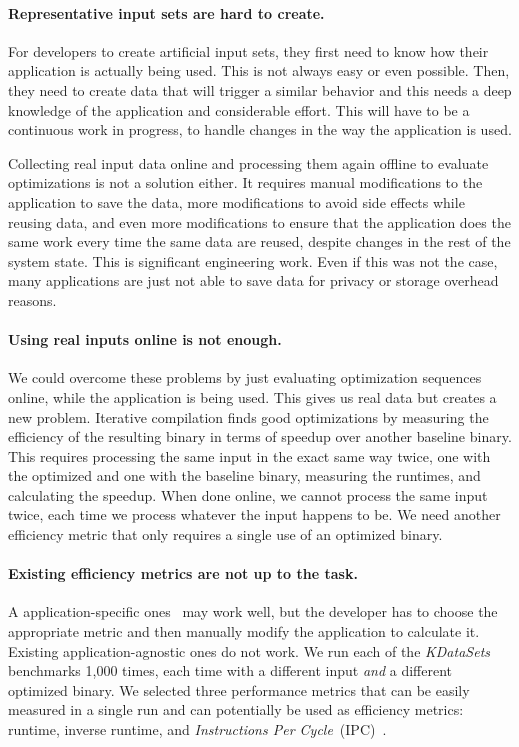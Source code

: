    \paragraph{Representative input sets are hard to create.} For developers to create artificial input sets, they first need to know how
    their application is actually being used. This is not always easy or even possible. Then, they need to create data that will trigger a
    similar behavior and this needs a deep knowledge of the application and considerable effort. This will have to be a continuous work in
    progress, to handle changes in the way the application is used.

    Collecting real input data online and processing them again offline to evaluate optimizations is not a solution either. It requires
    manual modifications to the application to save the data, more modifications to avoid side effects while reusing data, and even more
    modifications to ensure that the application does the same work every time the same data are reused, despite changes in the rest of
    the system state. This is significant engineering work. Even if this was not the case, many applications are just not able to save
    data for privacy or storage overhead reasons.
    
    \paragraph{Using real inputs online is not enough.} We could overcome these problems by just evaluating optimization sequences online,
    while the application is being used. This gives us real data but creates a new problem. Iterative compilation finds good optimizations
    by measuring the efficiency of the resulting binary in terms of speedup over another baseline binary. This requires processing the same
    input in the exact same way twice, one with the optimized and one with the baseline binary, measuring the runtimes, and calculating the
    speedup. When done online, we cannot process the same input twice, each time we process whatever the input happens to be. We need
    another efficiency metric that only requires a single use of an optimized binary.

    \paragraph{Existing efficiency metrics are not up to the task.} A application-specific ones~\cite{alameldeen06,coppa14} may work well,
    but the developer has to choose the appropriate metric and then manually modify the application to calculate it. Existing
    application-agnostic ones do not work. We run each of the  \textit{KDataSets} benchmarks 1,000 times, each time with a
    different input \textit{and} a different optimized binary. We selected three performance metrics that can be easily measured in a
    single run and can potentially be used as efficiency metrics: runtime, inverse runtime, and
    \textit{Instructions Per Cycle}~(IPC)~\citep{fursin07}.
   
